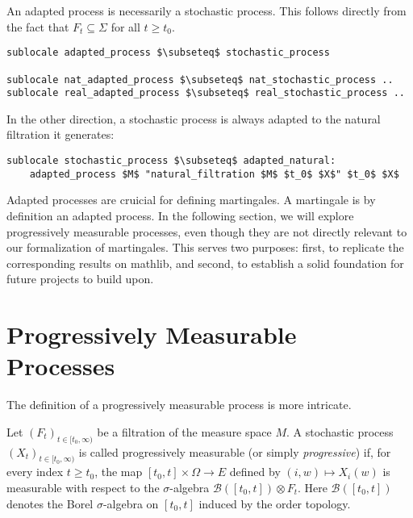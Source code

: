 An adapted process is necessarily a stochastic process. This follows directly from the fact that $F_t \subseteq \Sigma$ for all $t \ge t_0$.

\begin{isalemma}
{\small
\begin{lstlisting}[style=isabelle]
sublocale adapted_process $\subseteq$ stochastic_process 

sublocale nat_adapted_process $\subseteq$ nat_stochastic_process ..
sublocale real_adapted_process $\subseteq$ real_stochastic_process ..
\end{lstlisting}
}
\end{isalemma}


In the other direction, a stochastic process is always adapted to the natural filtration it generates:

\begin{isalemma}
{\small
\begin{lstlisting}[style=isabelle]
sublocale stochastic_process $\subseteq$ adapted_natural: 
	adapted_process $M$ "natural_filtration $M$ $t_0$ $X$" $t_0$ $X$ 
\end{lstlisting}
}
\end{isalemma}

Adapted processes are cruicial for defining martingales. A martingale is by definition an adapted process. In the following section, we will explore progressively measurable processes, even though they are not directly relevant to our formalization of martingales. This serves two purposes: first, to replicate the corresponding results on \textsf{mathlib}, and second, to establish a solid foundation for future projects to build upon.

\section{Progressively Measurable Processes}

The definition of a progressively measurable process is more intricate.

\begin{definition}
	Let $(F_t)_{t \in [t_0, \infty)}$ be a filtration of the measure space $M$. A stochastic process $(X_t)_{t \in [t_0, \infty)}$ is called progressively measurable (or simply \textit{progressive}) if, for every index $t \ge t_0$, the map $[t_0, t] \times \Omega \rightarrow E$ defined by $(i, w) \mapsto X_i(w)$ is measurable with respect to the $\sigma$-algebra $\mathcal{B}([t_0, t]) \otimes F_t$. Here $\mathcal{B}([t_0, t])$ denotes the Borel $\sigma$-algebra on $[t_0, t]$ induced by the order topology.
\end{definition}

